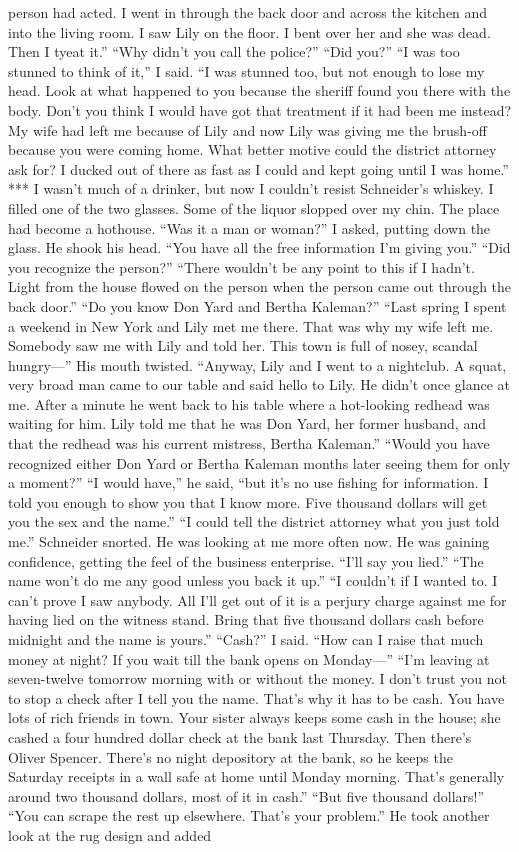 \documentclass{novel}
\begin{document}
person had acted. I went in through the back door and across the kitchen and into the living room. I saw Lily on the floor. I bent over her and she was dead. Then I tyeat it.” “Why didn’t you call the police?” “Did you?” “I was too stunned to think of it,” I said. “I was stunned too, but not enough to lose my head. Look at what happened to you because the sheriff found you there with the body. Don’t you think I would have got that treatment if it had been me instead? My wife had left me because of Lily and now Lily was giving me the brush-off because you were coming home. What better motive could the district attorney ask for? I ducked out of there as fast as I could and kept going until I was home.” *** I wasn’t much of a drinker, but now I couldn’t resist Schneider’s whiskey. I filled one of the two glasses. Some of the liquor slopped over my chin. The place had become a hothouse. “Was it a man or woman?” I asked, putting down the glass. He shook his head. “You have all the free information I’m giving you.” “Did you recognize the person?” “There wouldn’t be any point to this if I hadn’t. Light from the house flowed on the person when the person came out through the back door.” “Do you know Don Yard and Bertha Kaleman?” “Last spring I spent a weekend in New York and Lily met me there. That was why my wife left me. Somebody saw me with Lily and told her. This town is full of nosey, scandal hungry—” His mouth twisted. “Anyway, Lily and I went to a nightclub. A squat, very broad man came to our table and said hello to Lily. He didn’t once glance at me. After a minute he went back to his table where a hot-looking redhead was waiting for him. Lily told me that he was Don Yard, her former husband, and that the redhead was his current mistress, Bertha Kaleman.” “Would you have recognized either Don Yard or Bertha Kaleman months later seeing them for only a moment?” “I would have,” he said, “but it’s no use fishing for information. I told you enough to show you that I know more. Five thousand dollars will get you the sex and the name.” “I could tell the district attorney what you just told me.” Schneider snorted. He was looking at me more often now. He was gaining confidence, getting the feel of the business enterprise. “I’ll say you lied.” “The name won’t do me any good unless you back it up.” “I couldn’t if I wanted to. I can’t prove I saw anybody. All I’ll get out of it is a perjury charge against me for having lied on the witness stand. Bring that five thousand dollars cash before midnight and the name is yours.” “Cash?” I said. “How can I raise that much money at night? If you wait till the bank opens on Monday—” “I’m leaving at seven-twelve tomorrow morning with or without the money. I don’t trust you not to stop a check after I tell you the name. That’s why it has to be cash. You have lots of rich friends in town. Your sister always keeps some cash in the house; she cashed a four hundred dollar check at the bank last Thursday. Then there’s Oliver Spencer. There’s no night depository at the bank, so he keeps the Saturday receipts in a wall safe at home until Monday morning. That’s generally around two thousand dollars, most of it in cash.” “But five thousand dollars!” “You can scrape the rest up elsewhere. That’s your problem.” He took another look at the rug design and added 
\end{document}
